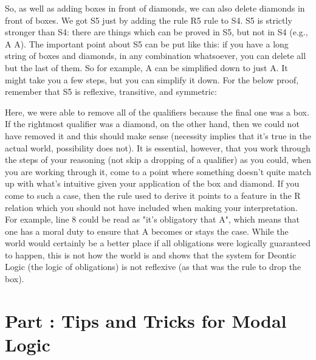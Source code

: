 So, as well as adding boxes in front of diamonds, we can also delete diamonds in front of boxes. We got S5 just by adding the rule R5 rule to S4. S5 is strictly stronger than S4: there are things which can be proved in S5, but not in S4 (e.g., \ediamond \ebox A \eif  \ebox A). The important point about S5 can be put like this: if you have a long string of boxes and diamonds, in any combination whatsoever, you can delete all but the last of them. So for example, \ediamond \ebox \ediamond \ediamond \ebox \ebox \ediamond \ebox A can be simplified down to just \ebox A. It might take you a few steps, but you can simplify it down. For the below proof, remember that S5 is reflexive, transitive, and symmetric: 
\begin{fitchproof}
		
\end{fitchproof}
Here, we were able to remove all of the qualifiers because the final one was a box. If the rightmost qualifier was a diamond, on the other hand, then we could not have removed it and this should make sense (necessity implies that it's true in the actual world, possibility does not). It is essential, however, that you work through the steps of your reasoning (not skip a dropping of a qualifier) as you could, when you are working through it, come to a point where something doesn't quite match up with what's intuitive given your application of the box and diamond. If you come to such a case, then the rule used to derive it points to a feature in the R relation which you should not have included when making your interpretation. For example, line 8 could be read as "it's obligatory that A", which means that one has a moral duty to ensure that A becomes or stays the case. While the world would certainly be a better place if all obligations were logically guaranteed to happen, this is not how the world is and shows that the system for Deontic Logic (the logic of obligations) is not reflexive (as that was the rule to drop the box). 
\setcounter{seccount}{1}
\chapter{Part \thechapcount: Tips and Tricks for Modal Logic}
